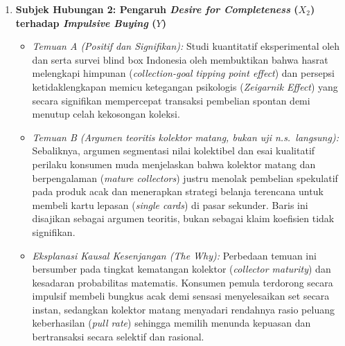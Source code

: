 \documentclass[12pt,a4paper]{article}
\numberwithin{equation}{section}
\numberwithin{table}{section}
\numberwithin{figure}{section}
\begin{document}
\begin{enumerate}
  \item \textbf{Subjek Hubungan 2: Pengaruh \emph{Desire for Completeness} ($X_2$) terhadap \emph{Impulsive Buying} ($Y$)}
  \begin{itemize}
    \item \emph{Temuan A (Positif dan Signifikan):} Studi kuantitatif eksperimental oleh \citet{gao2014completing} dan \citet{barasz2017pseudo} serta survei blind box Indonesia oleh \citet{dewi2026understanding} membuktikan bahwa hasrat melengkapi himpunan (\emph{collection-goal tipping point effect}) dan persepsi ketidaklengkapan memicu ketegangan psikologis (\emph{Zeigarnik Effect}) yang secara signifikan mempercepat transaksi pembelian spontan demi menutup celah kekosongan koleksi.
    \item \emph{Temuan B (Argumen teoritis kolektor matang, bukan uji n.s.\ langsung):} Sebaliknya, argumen segmentasi nilai kolektibel \citet{long2000consuming} dan esai kualitatif perilaku konsumen muda \citet{spero2004approach} menjelaskan bahwa kolektor matang dan berpengalaman (\emph{mature collectors}) justru menolak pembelian spekulatif pada produk acak dan menerapkan strategi belanja terencana untuk membeli kartu lepasan (\emph{single cards}) di pasar sekunder. Baris ini disajikan sebagai argumen teoritis, bukan sebagai klaim koefisien tidak signifikan.
    \item \emph{Eksplanasi Kausal Kesenjangan (\emph{The Why}):} Perbedaan temuan ini bersumber pada tingkat kematangan kolektor (\emph{collector maturity}) dan kesadaran probabilitas matematis. Konsumen pemula terdorong secara impulsif membeli bungkus acak demi sensasi menyelesaikan set secara instan, sedangkan kolektor matang menyadari rendahnya rasio peluang keberhasilan (\emph{pull rate}) sehingga memilih menunda kepuasan dan bertransaksi secara selektif dan rasional.
  \end{itemize}


\end{enumerate}
\end{document}
